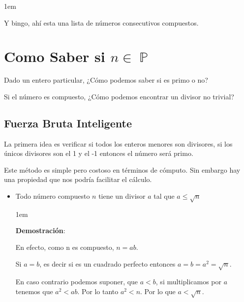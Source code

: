 \documentclass[12pt, fleqn]{report}                             %
\newenvironment{SmallIndentation}[1][0.75em]                    %
    {\begin{adjustwidth}{#1}{}\begin{footnotesize}}                 %
    {\end{footnotesize}\end{adjustwidth}}                           %
\DeclareMathOperator \Naturals  {\mathbb{N}}                     %
\DeclareMathOperator \Primes    {\mathbb{P}}                     %
\begin{document}
\begin{itemize}
\begin{SmallIndentation}[1em]
                    Y bingo, ahí esta una lista de números consecutivos compuestos.

                \end{SmallIndentation}

        \end{itemize}





    \clearpage
    \section{Como Saber si $n \in \Primes$}
    
        Dado un entero particular, ¿Cómo podemos saber si es primo o no?

        Si el número es compuesto, ¿Cómo podemos encontrar un divisor no trivial?


        \subsection{Fuerza Bruta Inteligente}

            La primera idea es verificar si todos los enteros menores son
            divisores, si los únicos divisores son el 1 y el -1 entonces
            el número será primo.

            Este método es simple pero costoso en términos de cómputo. Sin
            embargo hay una propiedad que nos podría facilitar el cálculo.

            \begin{itemize}

                \item Todo número compuesto $n$ tiene un divisor $a$ tal que
                    $a \leq \sqrt{n}$

                    \begin{SmallIndentation}[1em]
                        \textbf{Demostración}:

                        En efecto, como n es compuesto, $n = ab$.

                        Si $a = b$, es decir si es un cuadrado perfecto entonces
                        $a = b = a^2 = \sqrt{n}$.

                        En caso contrario podemos suponer, que $a<b$, si multiplicamos
                        por $a$ tenemos que $a^2<ab$. Por lo tanto $a^2 < n$.
                        Por lo que $a < \sqrt{n}$.

                    \end{SmallIndentation}

                \end{itemize}
\end{document}
